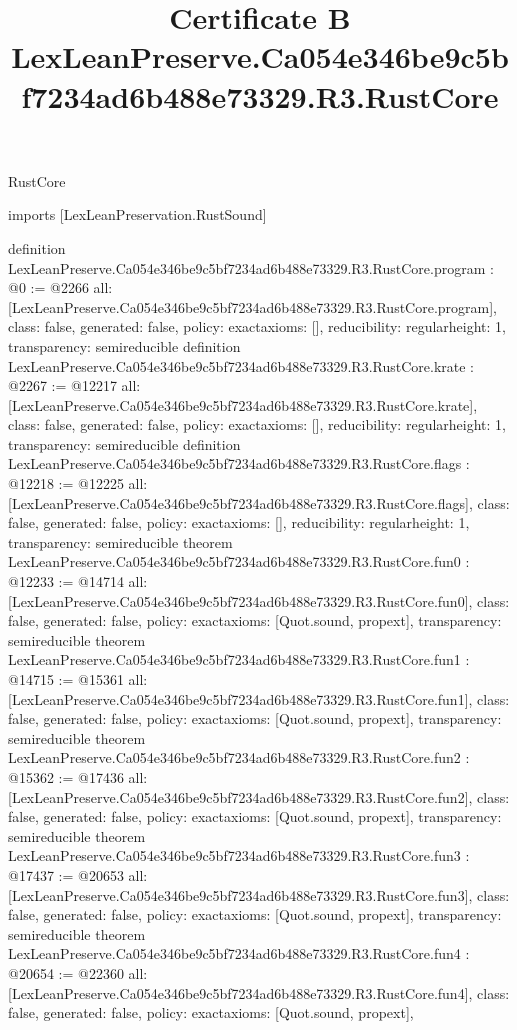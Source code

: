 \begin{lexlean}{RustCore}
\title{Certificate B LexLeanPreserve.Ca054e346be9c5bf7234ad6b488e73329.R3.RustCore}
\begin{coremodule}
imports [LexLeanPreservation.RustSound]

definition LexLeanPreserve.Ca054e346be9c5bf7234ad6b488e73329.R3.RustCore.program : @0 := @2266 {
  all: [LexLeanPreserve.Ca054e346be9c5bf7234ad6b488e73329.R3.RustCore.program],
  class: false,
  generated: false,
  policy: exact{axioms: []},
  reducibility: regular{height: 1},
  transparency: semireducible
}
definition LexLeanPreserve.Ca054e346be9c5bf7234ad6b488e73329.R3.RustCore.krate : @2267 := @12217 {
  all: [LexLeanPreserve.Ca054e346be9c5bf7234ad6b488e73329.R3.RustCore.krate],
  class: false,
  generated: false,
  policy: exact{axioms: []},
  reducibility: regular{height: 1},
  transparency: semireducible
}
definition LexLeanPreserve.Ca054e346be9c5bf7234ad6b488e73329.R3.RustCore.flags : @12218 := @12225 {
  all: [LexLeanPreserve.Ca054e346be9c5bf7234ad6b488e73329.R3.RustCore.flags],
  class: false,
  generated: false,
  policy: exact{axioms: []},
  reducibility: regular{height: 1},
  transparency: semireducible
}
theorem LexLeanPreserve.Ca054e346be9c5bf7234ad6b488e73329.R3.RustCore.fun0 : @12233 := @14714 {
  all: [LexLeanPreserve.Ca054e346be9c5bf7234ad6b488e73329.R3.RustCore.fun0],
  class: false,
  generated: false,
  policy: exact{axioms: [Quot.sound, propext]},
  transparency: semireducible
}
theorem LexLeanPreserve.Ca054e346be9c5bf7234ad6b488e73329.R3.RustCore.fun1 : @14715 := @15361 {
  all: [LexLeanPreserve.Ca054e346be9c5bf7234ad6b488e73329.R3.RustCore.fun1],
  class: false,
  generated: false,
  policy: exact{axioms: [Quot.sound, propext]},
  transparency: semireducible
}
theorem LexLeanPreserve.Ca054e346be9c5bf7234ad6b488e73329.R3.RustCore.fun2 : @15362 := @17436 {
  all: [LexLeanPreserve.Ca054e346be9c5bf7234ad6b488e73329.R3.RustCore.fun2],
  class: false,
  generated: false,
  policy: exact{axioms: [Quot.sound, propext]},
  transparency: semireducible
}
theorem LexLeanPreserve.Ca054e346be9c5bf7234ad6b488e73329.R3.RustCore.fun3 : @17437 := @20653 {
  all: [LexLeanPreserve.Ca054e346be9c5bf7234ad6b488e73329.R3.RustCore.fun3],
  class: false,
  generated: false,
  policy: exact{axioms: [Quot.sound, propext]},
  transparency: semireducible
}
theorem LexLeanPreserve.Ca054e346be9c5bf7234ad6b488e73329.R3.RustCore.fun4 : @20654 := @22360 {
  all: [LexLeanPreserve.Ca054e346be9c5bf7234ad6b488e73329.R3.RustCore.fun4],
  class: false,
  generated: false,
  policy: exact{axioms: [Quot.sound, propext]},
}
\end{coremodule}
\end{lexlean}

